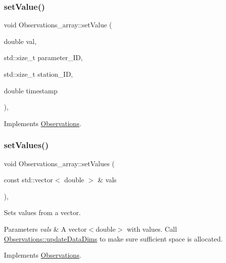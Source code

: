 \subsubsection{\texorpdfstring{set\+Value()}{setValue()}\hspace{0.1cm}{\footnotesize\ttfamily [2/2]}}
{\footnotesize\ttfamily void Observations\+\_\+array\+::set\+Value (\begin{DoxyParamCaption}\item[{double}]{val,  }\item[{std\+::size\+\_\+t}]{parameter\+\_\+\+ID,  }\item[{std\+::size\+\_\+t}]{station\+\_\+\+ID,  }\item[{double}]{timestamp }\end{DoxyParamCaption})\hspace{0.3cm}{\ttfamily [override]}, {\ttfamily [virtual]}}



Implements \mbox{\hyperlink{class_observations_a6ec8166ad0f141e23a07847ab3646a61}{Observations}}.

\mbox{\label{class_observations__array_ae4ed49512506eae597a158d4c87dbd31}} 
\subsubsection{\texorpdfstring{set\+Values()}{setValues()}}
{\footnotesize\ttfamily void Observations\+\_\+array\+::set\+Values (\begin{DoxyParamCaption}\item[{const std\+::vector$<$ double $>$ \&}]{vals }\end{DoxyParamCaption})\hspace{0.3cm}{\ttfamily [override]}, {\ttfamily [virtual]}}

Sets values from a vector.


\begin{DoxyParams}{Parameters}
{\em vals} & A vector$<$double$>$ with values. Call \mbox{\hyperlink{class_observations_aab0540879c2d3fdf5f91d30ea2f902fd}{Observations\+::update\+Data\+Dims}} to make sure sufficient space is allocated. \\
\hline
\end{DoxyParams}


Implements \mbox{\hyperlink{class_observations_a3aaf49cad714ff61c105d26b4b083ac3}{Observations}}.

